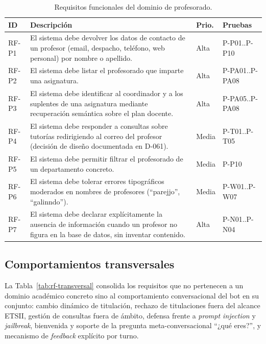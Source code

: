 \begin{table}[hbtp]
\centering
\small
\caption{Requisitos funcionales del dominio de profesorado.}\label{tab:rf-profesorado}
\begin{tabular}{|p{1.1cm}|p{8.2cm}|p{1.0cm}|p{2.0cm}|}
\hline
\textbf{ID} & \textbf{Descripción} & \textbf{Prio.} & \textbf{Pruebas} \\ \hline
RF-P1 & El sistema debe devolver los datos de contacto de un profesor (email, despacho, teléfono, web personal) por nombre o apellido. & Alta & P-P01..P-P10 \\ \hline
RF-P2 & El sistema debe listar el profesorado que imparte una asignatura. & Alta & P-PA01..P-PA08 \\ \hline
RF-P3 & El sistema debe identificar al coordinador y a los suplentes de una asignatura mediante recuperación semántica sobre el plan docente. & Alta & P-PA05..P-PA08 \\ \hline
RF-P4 & El sistema debe responder a consultas sobre tutorías redirigiendo al correo del profesor (decisión de diseño documentada en D-061). & Media & P-T01..P-T05 \\ \hline
RF-P5 & El sistema debe permitir filtrar el profesorado de un departamento concreto. & Media & P-P10 \\ \hline
RF-P6 & El sistema debe tolerar errores tipográficos moderados en nombres de profesores (``parejjo'', ``galinndo''). & Media & P-W01..P-W07 \\ \hline
RF-P7 & El sistema debe declarar explícitamente la ausencia de información cuando un profesor no figura en la base de datos, sin inventar contenido. & Alta & P-N01..P-N04 \\ \hline
\end{tabular}
\end{table}

\subsection{Comportamientos transversales}\label{subsec:rf-transversal}

La Tabla~\ref{tab:rf-transversal} consolida los requisitos que no pertenecen a un dominio académico concreto sino al comportamiento conversacional del bot en su conjunto: cambio dinámico de titulación, rechazo de titulaciones fuera del alcance ETSII, gestión de consultas fuera de ámbito, defensa frente a \textit{prompt injection} y \textit{jailbreak}, bienvenida y soporte de la pregunta meta-conversacional ``¿qué eres?'', y mecanismo de \textit{feedback} explícito por turno.

